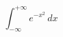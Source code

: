 \documentclass[a4paper,12pt,fleqn]{article}
\begin{document}
\begin{equation}
\int_{-\infty}^{+\infty} e^{-x^2} \, dx
\end{equation}
\end{document}
